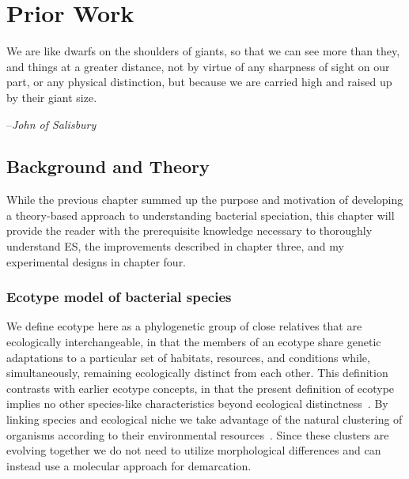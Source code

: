 \gobbletocpage
\chapter{Prior Work}
\restoretocpage


\begin{shadequote}
We are like dwarfs on the shoulders of giants, so that we can see more than they, and things at a greater distance, not by virtue of any sharpness of sight on our part, or any physical distinction, but because we are carried high and raised up by their giant size.\par--\emph{John of Salisbury}
\end{shadequote}

\section{Background and Theory}
While the previous chapter summed up the purpose and motivation of developing a theory-based approach to understanding bacterial speciation, this chapter will provide the reader with the prerequisite knowledge necessary to thoroughly understand ES, the improvements described in chapter three, and my experimental designs in chapter four.

\subsection*{Ecotype model of bacterial species}
We define ecotype here as a phylogenetic group of close relatives that are ecologically interchangeable, in that the members of an ecotype share genetic adaptations to a particular set of habitats, resources, and conditions while, simultaneously, remaining ecologically distinct from each other.
This definition contrasts with earlier ecotype concepts, in that the present definition of ecotype implies no other species-like characteristics beyond ecological distinctness~\cite{wiedenbeckHGT}.
By linking species and ecological niche we take advantage of the natural clustering of organisms according to their environmental resources~\cite{darwin1861origin}.
Since these clusters are evolving together we do not need to utilize morphological differences and can instead use a molecular approach for demarcation.

